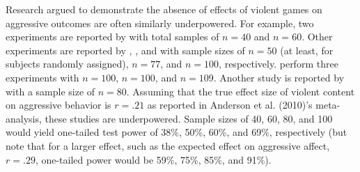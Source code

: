 \documentclass[man]{apa6}
\begin{document}
Research argued to demonstrate the absence of effects of violent games on aggressive outcomes are often similarly underpowered. For example, two experiments are reported by \citet{Adachi:Willoughby:2011} with total samples of $n = 40$ and $n = 60$. Other experiments are reported by \citet{Ferguson:etal:2008}, \citet{Ferguson:Rueda:2010}, and \citet{Valadez:Ferguson:2012} with sample sizes of $n = 50$ (at least, for subjects randomly assigned), $n = 77$, and $n = 100$, respectively. \citet[(Studies 1, 2, and 5)]{Przybylski:etal:2014} %
perform three experiments with $n = 100$, $n = 100$, and $n = 109$. Another study is reported by \citet{Elson:etal:2014} with a sample size of $ n = 80 $. Assuming that the true effect size of violent content on aggressive behavior is $ r = .21 $ as reported in Anderson et al. (2010)'s meta-analysis, these studies are underpowered. Sample sizes of 40, 60, 80, and 100 would yield one-tailed test power of 38\%, 50\%, 60\%, and 69\%, respectively (but note that for a larger effect, such as the expected effect on aggressive affect, $r = .29$, one-tailed power would be 59\%, 75\%, 85\%, and 91\%). %
\end{document}
